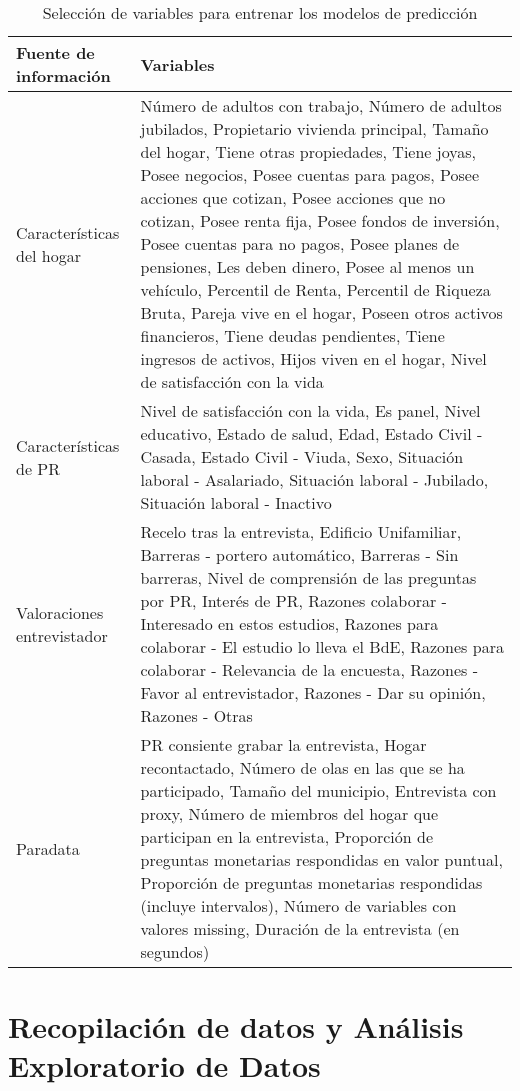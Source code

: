 \begin{table}[htbp]
\centering{}
\begin{tabular}{l p{10cm}}
\hline
\textbf{Fuente de información} & \textbf{Variables} \\ \hline
Características del hogar & Número de adultos con trabajo, Número de adultos jubilados, Propietario vivienda principal, Tamaño del hogar, Tiene otras propiedades, Tiene joyas, Posee negocios, Posee cuentas para pagos, Posee acciones que cotizan, Posee acciones que no cotizan, Posee renta fija, Posee fondos de inversión, Posee cuentas para no pagos, Posee planes de pensiones, Les deben dinero, Posee al menos un vehículo, Percentil de Renta, Percentil de Riqueza Bruta, Pareja vive en el hogar, Poseen otros activos financieros, Tiene deudas pendientes, Tiene ingresos de activos, Hijos viven en el hogar, Nivel de satisfacción con la vida \\ \hline
Características de PR & Nivel de satisfacción con la vida, Es panel, Nivel educativo, Estado de salud, Edad, Estado Civil - Casada, Estado Civil - Viuda, Sexo, Situación laboral - Asalariado, Situación laboral - Jubilado, Situación laboral - Inactivo \\ \hline
Valoraciones entrevistador & Recelo tras la entrevista, Edificio Unifamiliar, Barreras - portero automático, Barreras - Sin barreras, Nivel de comprensión de las preguntas por PR, Interés de PR, Razones colaborar - Interesado en estos estudios, Razones para colaborar - El estudio lo lleva el BdE, Razones para colaborar - Relevancia de la encuesta, Razones - Favor al entrevistador, Razones - Dar su opinión, Razones - Otras \\ \hline
Paradata & PR consiente grabar la entrevista, Hogar recontactado, Número de olas en las que se ha participado, Tamaño del municipio, Entrevista con proxy, Número de miembros del hogar que participan en la entrevista, Proporción de preguntas monetarias respondidas en valor puntual, Proporción de preguntas monetarias respondidas (incluye intervalos), Número de variables con valores missing, Duración de la entrevista (en segundos) \\ \hline
\end{tabular}
\caption{Selección de variables para entrenar los modelos de predicción}
\label{table:vars}
\end{table}

\section{Recopilación de datos y Análisis Exploratorio de Datos}

